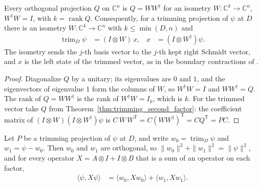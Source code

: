 \begin{theorem}
    \label{thm:trimming_isometric_factorization}
    \leanok
    Every orthogonal projection $Q$ on $\mathbb C^n$ is $Q=WW^\dagger$ for an
    isometry $W\colon\mathbb C^k\to\mathbb C^n$, $W^\dagger W=I$, with
    $k=\operatorname{rank}Q$. Consequently, for a trimming projection of
    $\psi$ at $D$ there is an isometry $W\colon\mathbb C^k\to\mathbb C^n$
    with $k\le\min(D,n)$ and
    \begin{align}
        \operatorname{trim}_D\psi & =(I\otimes W)\,x,
                                  & x & =(I\otimes W^\dagger)\psi.
        \label{eq:trimming_isometric_factorization}
    \end{align}
    The isometry sends the $j$-th basis vector to the $j$-th kept right
    Schmidt vector, and $x$ is the left state of the trimmed vector, as in
    the boundary contractions of \cite{Landau2013PolynomialTime}.
\end{theorem}

\begin{proof}
    \leanok
    Diagonalize $Q$ by a unitary; its eigenvalues are $0$ and $1$, and the
    eigenvectors of eigenvalue $1$ form the columns of $W$, so $W^\dagger
        W=I$ and $WW^\dagger=Q$. The rank of $Q=WW^\dagger$ is the rank of
    $W^\dagger W=I_k$, which is $k$. For the trimmed vector take $Q$ from
    Theorem~\ref{thm:trimming_second_factor}: the coefficient matrix of
    $(I\otimes W)(I\otimes W^\dagger)\psi$ is
    $C\,\overline{W}\,W^{\mathsf T}=C(WW^\dagger)^{\mathsf T}=CQ^{\mathsf T}=PC$.
\end{proof}

\begin{theorem}
    \label{thm:trimming_no_cross_terms}
    \leanok
    Let $P$ be a trimming projection of $\psi$ at $D$, and write
    $w_0=\operatorname{trim}_D\psi$ and $w_1=\psi-w_0$. Then $w_0$ and $w_1$
    are orthogonal, so $\|w_0\|^2+\|w_1\|^2=\|\psi\|^2$, and for every
    operator $X=A\otimes I+I\otimes B$ that is a sum of an operator on each
    factor,
    \begin{align}
        \langle\psi,X\psi\rangle & =\langle w_0,Xw_0\rangle
        +\langle w_1,Xw_1\rangle.
        \label{eq:trimming_no_cross_terms}
    \end{align}
\end{theorem}

